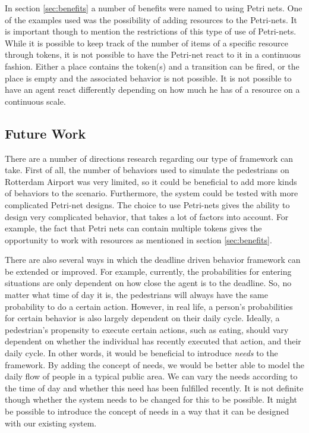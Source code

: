 \documentclass[11pt, a4paper]{book}
\begin{document}
In section \ref{sec:benefits} a number of benefits were named to using Petri nets. One of the examples used was the possibility of adding resources to the Petri-nets. It is important though to mention the restrictions of this type of use of Petri-nets. While it is possible to keep track of the number of items of a specific resource through tokens, it is not possible to have the Petri-net react to it in a continuous fashion. Either a place contains the token(s) and a transition can be fired, or the place is empty and the associated behavior is not possible. It is not possible to have an agent react differently depending on how much he has of a resource on a continuous scale. 


\subsection{Future Work}
There are a number of directions research regarding our type of framework can take. First of all, the number of behaviors used to simulate the pedestrians on Rotterdam Airport was very limited, so it could be beneficial to add more kinds of behaviors to the scenario. Furthermore, the system could be tested with more complicated Petri-net designs. The choice to use Petri-nets gives the ability to design very complicated behavior, that takes a lot of factors into account. For example, the fact that Petri nets can contain multiple tokens gives the opportunity to work with resources as mentioned in section \ref{sec:benefits}.

There are also several ways in which the deadline driven behavior framework can be extended or improved. For example, currently, the probabilities for entering situations are only dependent on how close the agent is to the deadline. So, no matter what time of day it is, the pedestrians will always have the same probability to do a certain action. However, in real life, a person's probabilities for certain behavior is also largely dependent on their daily cycle. Ideally, a pedestrian's propensity to execute certain actions, such as eating, should vary dependent on whether the individual has recently executed that action, and their daily cycle. In other words, it would be beneficial to introduce \emph{needs} to the framework. By adding the concept of needs, we would be better able to model the daily flow of people in a typical public area. We can vary the needs according to the time of day and whether this need has been fulfilled recently. It is not definite though whether the system needs to be changed for this to be possible. It might be possible to introduce the concept of needs in a way that it can be designed with our existing system.
\end{document}
